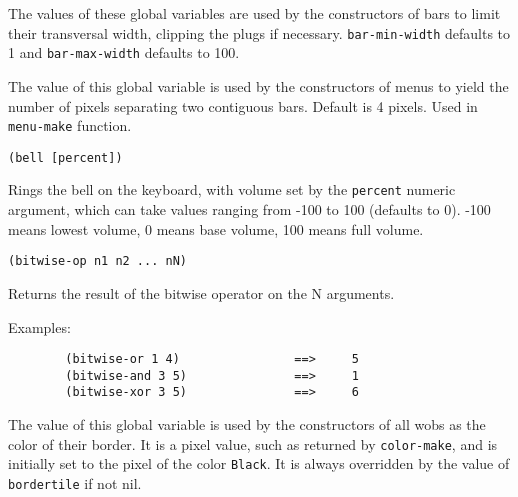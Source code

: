 

The values of these global variables are used by the constructors of bars to
limit their transversal width, clipping the plugs if necessary.
\verb"bar-min-width" defaults to 1 and \verb"bar-max-width" defaults to 100.

        

The value of this global variable is used by the constructors of menus to
yield the number of pixels separating two contiguous bars.  Default is 4
pixels. Used in  \verb"menu-make" function.


{\usagefont\begin{verbatim}
(bell [percent])
\end{verbatim}}\usageupspace

Rings the bell on the keyboard, with volume set by the \verb"percent"
numeric argument, which can take values ranging from -100 to 100 (defaults
to 0). -100 means lowest volume, 0 means base volume, 100 means full volume.

        
{\usagefont\begin{verbatim}
(bitwise-op n1 n2 ... nN)
\end{verbatim}}\usageupspace

Returns the result of the bitwise operator on the N arguments.

{Examples:\exemplefont\upspace\begin{verbatim}
        (bitwise-or 1 4)                ==>     5
        (bitwise-and 3 5)               ==>     1
        (bitwise-xor 3 5)               ==>     6
\end{verbatim}}

        

The value of this global variable is used by the constructors of all wobs as
the color of their border. It is a pixel value, such as returned by
\verb"color-make", and is initially set to the pixel of the color
\verb"Black". It is always overridden by the value of \verb"bordertile" if
not nil.

